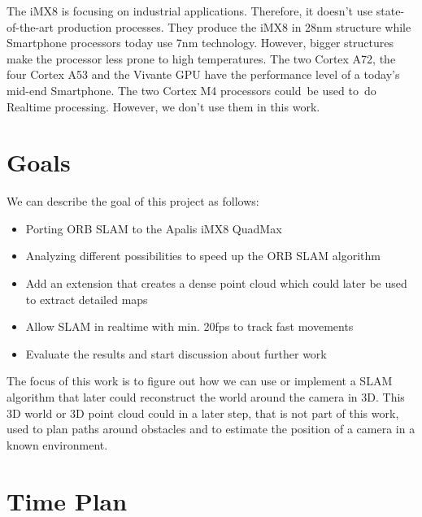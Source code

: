 \documentclass[11pt,a4paper,titlepage,oneside]{report}
\begin{document}
The iMX8 is focusing on industrial applications. Therefore, it doesn’t use state-of-the-art production processes. They produce the iMX8 in 28nm structure while Smartphone processors today use 7nm technology. However, bigger structures make the processor less prone to high temperatures. The two Cortex A72, the four Cortex A53 and the Vivante GPU have the performance level of a today's mid-end Smartphone. The two Cortex M4 processors could be used to do Realtime processing. However, we don’t use them in this work.

\section{Goals}
We can describe the goal of this project as follows:
\begin{itemize}
\item Porting ORB SLAM to the Apalis iMX8 QuadMax
\item Analyzing different possibilities to speed up the ORB SLAM algorithm
\item Add an extension that creates a dense point cloud which could later be used to extract detailed maps
\item Allow SLAM in realtime with min. 20fps to track fast movements
\item Evaluate the results and start discussion about further work
\end{itemize}

The focus of this work is to figure out how we can use or implement a SLAM algorithm that later could reconstruct the world around the camera in 3D. This 3D world or 3D point cloud could in a later step, that is not part of this work, used to plan paths around obstacles and to estimate the position of a camera in a known environment.

\section{Time Plan}
\end{document}
